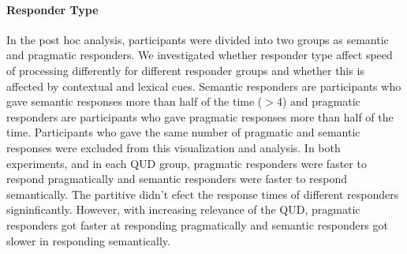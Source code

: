 \documentclass[12pt]{article}
\begin{document}
\paragraph{Responder Type}
In the post hoc analysis, participants were divided into two groups as semantic and pragmatic responders. We investigated whether responder type affect speed of processing differently for different responder groups and whether this is affected by contextual and lexical cues. Semantic responders are participants who gave semantic responses more than half of the time ($>$4) and pragmatic responders are participants who gave pragmatic responses more than half of the time. Participants who gave the same number of pragmatic and semantic responses were excluded from this visualization and analysis.
In both experiments, and in each QUD group, pragmatic responders were faster to respond pragmatically and semantic responders were faster to respond semantically. The partitive didn’t efect the response times of different responders signinficantly. However, with increasing relevance of the QUD, pragmatic responders got faster at responding pragmatically and semantic responders got slower in responding semantically.

\pagebreak
\end{document}
